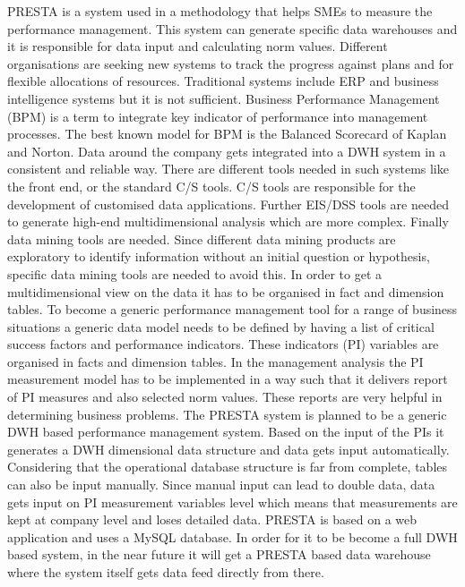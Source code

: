 \documentclass[../paper.tex]{subfiles}
\begin{document}
PRESTA is a system used in a methodology that helps SMEs to measure the performance management. This system can generate specific data warehouses and it is responsible for data input and calculating norm values. Different organisations are seeking new systems to track the progress against plans and for flexible allocations of resources. Traditional systems include ERP and business intelligence systems but it is not sufficient. Business Performance Management (BPM) is a term to integrate key indicator of performance into management processes. The best known model for BPM is the Balanced Scorecard of Kaplan and Norton. Data around the company gets integrated into a DWH system in a consistent and reliable way. There are different tools needed in such systems like the front end, or the standard C/S tools. C/S tools are responsible for the development of customised data applications. Further EIS/DSS tools are needed to generate high-end multidimensional analysis which are more complex. Finally data mining tools are needed. Since different data mining products are exploratory to identify information without an initial question or hypothesis, specific data mining tools are needed to avoid this. In order to get a multidimensional view on the data it has to be organised in fact and dimension tables. To become a generic performance management tool for a range of business situations a generic data model needs to be defined by having a list of critical success factors and performance indicators. These indicators (PI) variables are organised in facts and dimension tables. In the management analysis the PI measurement model has to be implemented in a way such that it delivers report of PI measures and also selected norm values. These reports are very helpful in determining business problems. The PRESTA system is planned to be a generic DWH based performance management system. Based on the input of the PIs it generates a DWH dimensional data structure and data gets input automatically. Considering that the operational database structure is far from complete, tables can also be input manually. Since manual input can lead to double data, data gets input on PI measurement variables level which means that measurements are kept at company level and loses detailed data. PRESTA is based on a web application and uses a MySQL database. In order for it to be become a full DWH based system, in the near future it will get a PRESTA based data warehouse where the system itself gets data feed directly from there.
\end{document}
